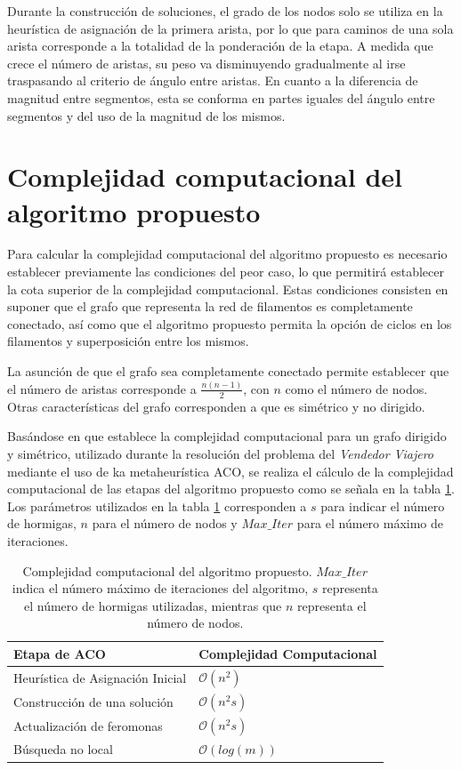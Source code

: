 Durante la construcci\'on de soluciones, el grado de los nodos solo se utiliza en la heur\'istica de asignaci\'on de la primera arista, por lo que para caminos de una sola arista corresponde a la totalidad de la ponderaci\'on de la etapa. A medida que crece el n\'umero de aristas, su peso va disminuyendo gradualmente al irse traspasando al criterio de \'angulo entre aristas. En cuanto a la diferencia de magnitud entre segmentos, esta se conforma en partes iguales del \'angulo entre segmentos y del uso de la magnitud de los mismos.

\section{Complejidad computacional del algoritmo propuesto}
\label{sec:compComplexity}

Para calcular la complejidad computacional del algoritmo propuesto es necesario establecer previamente las condiciones del peor caso, lo que permitir\'a establecer la cota superior de la complejidad computacional. Estas condiciones consisten en suponer que el grafo que representa la red de filamentos es completamente conectado, as\'i como que el algoritmo propuesto permita la opci\'on de ciclos en los filamentos y superposici\'on entre los mismos.

La asunci\'on de que el grafo sea completamente conectado permite establecer que el n\'umero de aristas corresponde a $\frac{n(n-1)}{2}$, con $n$ como el n\'umero de nodos. Otras caracter\'isticas del grafo corresponden a que es sim\'etrico y no dirigido.

Bas\'andose en \citep{li2015efficiency} que establece la complejidad computacional para un grafo dirigido y sim\'etrico, utilizado durante la resoluci\'on del problema del {\it Vendedor Viajero} mediante el uso de ka metaheur\'istica ACO, se realiza el c\'alculo de la complejidad computacional de las etapas del algoritmo propuesto como se se\~nala en la tabla \ref{tab:computComplexity}. Los par\'ametros utilizados en la tabla \ref{tab:computComplexity} corresponden a $s$ para indicar el n\'umero de hormigas, $n$ para el n\'umero de nodos y $Max\_Iter$ para el n\'umero m\'aximo de iteraciones.


\begin{table}[h]
    \centering
    \begin{tabular}{|l|l|}
    \hline
    Etapa de ACO & Complejidad Computacional \\\hline
    Heur\'istica de Asignaci\'on Inicial & $\mathcal{O}{(n^{2})}$ \\
    Construcci\'on de una soluci\'on & $\mathcal{O}{(n^{2}s)}$ \\
    Actualizaci\'on de feromonas & $\mathcal{O}{(n^{2}s)}$ \\
    B\'usqueda no local & $\mathcal{O}{(log(m))}$ \\
    \hline
    \end{tabular}
    \caption{Complejidad computacional del algoritmo propuesto. $Max\_Iter$ indica el n\'umero m\'aximo de iteraciones del algoritmo, $s$ representa el n\'umero de hormigas utilizadas, mientras que $n$ representa el n\'umero de nodos.}
    \label{tab:computComplexity}
\end{table}

